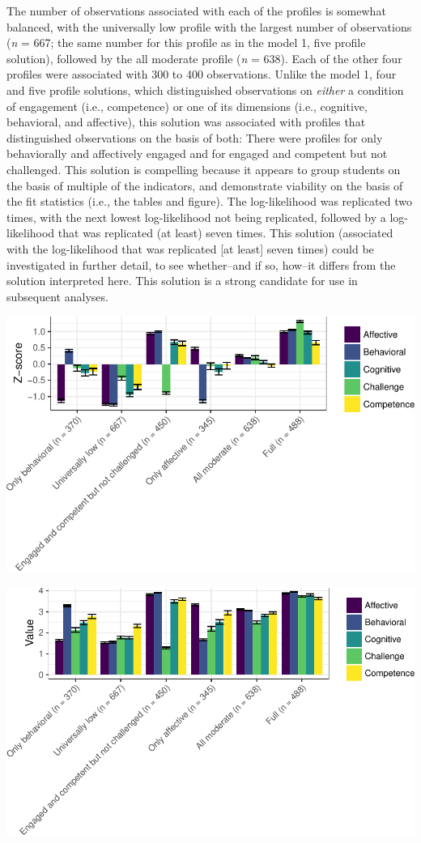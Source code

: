 \documentclass[]{msu-thesis}
\theoremstyle{definition}
\theoremstyle{definition}
\theoremstyle{definition}
\theoremstyle{remark}
\begin{document}
The number of observations associated with each of the profiles is
somewhat balanced, with the universally low profile with the largest
number of observations (\emph{n} = 667; the same number for this profile
as in the model 1, five profile solution), followed by the all moderate
profile (\emph{n} = 638). Each of the other four profiles were
associated with 300 to 400 observations. Unlike the model 1, four and
five profile solutions, which distinguished observations on
\emph{either} a condition of engagement (i.e., competence) or one of its
dimensions (i.e., cognitive, behavioral, and affective), this solution
was associated with profiles that distinguished observations on the
basis of both: There were profiles for only behaviorally and affectively
engaged and for engaged and competent but not challenged. This solution
is compelling because it appears to group students on the basis of
multiple of the indicators, and demonstrate viability on the basis of
the fit statistics (i.e., the tables and figure). The log-likelihood was
replicated two times, with the next lowest log-likelihood not being
replicated, followed by a log-likelihood that was replicated (at least)
seven times. This solution (associated with the log-likelihood that was
replicated {[}at least{]} seven times) could be investigated in further
detail, to see whether--and if so, how--it differs from the solution
interpreted here. This solution is a strong candidate for use in
subsequent analyses.

\begin{center}\includegraphics[width=0.8\linewidth]{rosenberg-dissertation_files/figure-latex/m1_6p-1} \end{center}

\begin{center}\includegraphics[width=0.8\linewidth]{rosenberg-dissertation_files/figure-latex/m1_6p-2} \end{center}
\end{document}
